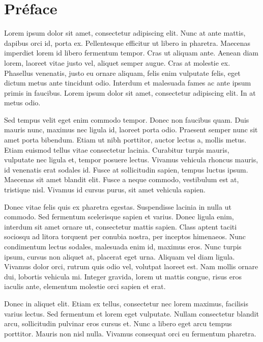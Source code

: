 \documentclass[a4paper,french,bookmarks]{book}
\begin{document}
    
    \begin{titlepage}
        
    \end{titlepage}

    \chapter*{Préface}
    
    Lorem ipsum dolor sit amet, consectetur adipiscing elit. Nunc at ante mattis, dapibus orci id, porta ex. Pellentesque efficitur ut libero in pharetra. Maecenas imperdiet lorem id libero fermentum tempor. Cras ut aliquam ante. Aenean diam lorem, laoreet vitae justo vel, aliquet semper augue. Cras at molestie ex. Phasellus venenatis, justo eu ornare aliquam, felis enim vulputate felis, eget dictum metus ante tincidunt odio. Interdum et malesuada fames ac ante ipsum primis in faucibus. Lorem ipsum dolor sit amet, consectetur adipiscing elit. In at metus odio.

    Sed tempus velit eget enim commodo tempor. Donec non faucibus quam. Duis mauris nunc, maximus nec ligula id, laoreet porta odio. Praesent semper nunc sit amet porta bibendum. Etiam ut nibh porttitor, auctor lectus a, mollis metus. Etiam euismod tellus vitae consectetur lacinia. Curabitur turpis mauris, vulputate nec ligula et, tempor posuere lectus. Vivamus vehicula rhoncus mauris, id venenatis erat sodales id. Fusce at sollicitudin sapien, tempus luctus ipsum. Maecenas sit amet blandit elit. Fusce a neque commodo, vestibulum est at, tristique nisl. Vivamus id cursus purus, sit amet vehicula sapien.

    Donec vitae felis quis ex pharetra egestas. Suspendisse lacinia in nulla ut commodo. Sed fermentum scelerisque sapien et varius. Donec ligula enim, interdum sit amet ornare ut, consectetur mattis sapien. Class aptent taciti sociosqu ad litora torquent per conubia nostra, per inceptos himenaeos. Nunc condimentum lectus sodales, malesuada enim id, maximus eros. Nunc turpis ipsum, cursus non aliquet at, placerat eget urna. Aliquam vel diam ligula. Vivamus dolor orci, rutrum quis odio vel, volutpat laoreet est. Nam mollis ornare dui, lobortis vehicula mi. Integer gravida, lorem ut mattis congue, risus eros iaculis ante, elementum molestie orci sapien et erat.

    Donec in aliquet elit. Etiam ex tellus, consectetur nec lorem maximus, facilisis varius lectus. Sed fermentum et lorem eget vulputate. Nullam consectetur blandit arcu, sollicitudin pulvinar eros cursus et. Nunc a libero eget arcu tempus porttitor. Mauris non nisl nulla. Vivamus consequat orci eu fermentum pharetra.
\end{document}
